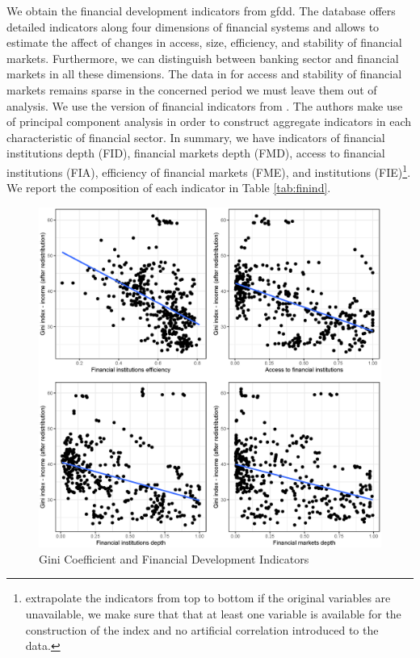\documentclass[a4paper,11pt]{article}
\begin{document}
We obtain the financial development indicators from \ac{gfdd}. The database offers detailed indicators along four dimensions of financial systems and allows to estimate the affect of changes in access, size, efficiency, and stability of financial markets. Furthermore, we can distinguish between banking sector and financial markets in all these dimensions. The data in for access and stability of financial markets remains sparse in the concerned period we must leave them out of analysis. We use the version of financial indicators from \cite{svirydzenka2016introducing}. The authors make use of principal component analysis in order to construct aggregate indicators in each characteristic of financial sector. In summary, we have indicators of financial institutions depth (FID), financial markets depth (FMD), access to financial institutions (FIA), efficiency of financial markets (FME), and institutions (FIE)\footnote{\citet{svirydzenka2016introducing} extrapolate the indicators from top to bottom if the original variables are unavailable, we make sure that that at least one variable is available for the construction of the index and no artificial correlation introduced to the data.}. We report the composition of each indicator in Table \ref{tab:finind}. 

\begin{figure}
    \label{fig:gini_findev}
        \caption{Gini Coefficient and Financial Development Indicators}
    \includegraphics[width=\textwidth, keepaspectratio]{figures/plots_findev_gini}
    \end{figure}
    
\end{document}
